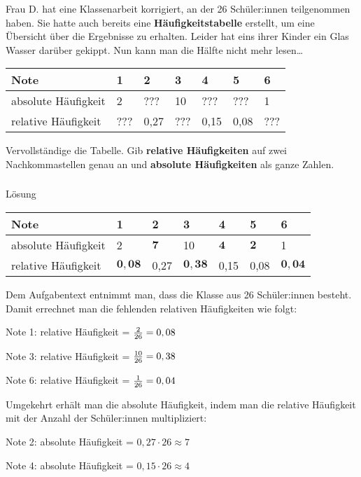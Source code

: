 \documentclass[
  ngerman,
]{book}
\begin{document}
Frau D. hat eine Klassenarbeit korrigiert, an der 26 Schüler:innen teilgenommen haben. Sie hatte auch bereits eine \textbf{Häufigkeitstabelle} erstellt, um eine Übersicht über die Ergebnisse zu erhalten. Leider hat eins ihrer Kinder ein Glas Wasser darüber gekippt. Nun kann man die Hälfte nicht mehr lesen\ldots{}

\begin{longtable}[]{@{}lllllll@{}}
\toprule
Note & 1 & 2 & 3 & 4 & 5 & 6\tabularnewline
\midrule
\endhead
absolute Häufigkeit & 2 & ??? & 10 & ??? & ??? & 1\tabularnewline
relative Häufigkeit & ??? & 0,27 & ??? & 0,15 & 0,08 & ???\tabularnewline
\bottomrule
\end{longtable}

Vervollständige die Tabelle. Gib \textbf{relative Häufigkeiten} auf zwei Nachkommastellen genau an und \textbf{absolute Häufigkeiten} als ganze Zahlen.

\hypertarget{section-8}{%
\subsubsection*{}\label{section-8}}

Lösung

\begin{longtable}[]{@{}lllllll@{}}
\toprule
Note & 1 & 2 & 3 & 4 & 5 & 6\tabularnewline
\midrule
\endhead
absolute Häufigkeit & 2 & \(\mathbf{7}\) & 10 & \(\mathbf{4}\) & \(\mathbf{2}\) & 1\tabularnewline
relative Häufigkeit & \(\mathbf{0,08}\) & 0,27 & \(\mathbf{0,38}\) & 0,15 & 0,08 & \(\mathbf{0,04}\)\tabularnewline
\bottomrule
\end{longtable}

Dem Aufgabentext entnimmt man, dass die Klasse aus 26 Schüler:innen besteht. Damit errechnet man die fehlenden relativen Häufigkeiten wie folgt:

Note 1: relative Häufigkeit = \({2 \over 26} = 0,08\)

Note 3: relative Häufigkeit = \({10 \over 26} = 0,38\)

Note 6: relative Häufigkeit = \({1 \over 26} = 0,04\)

Umgekehrt erhält man die absolute Häufigkeit, indem man die relative Häufigkeit mit der Anzahl der Schüler:innen multipliziert:

Note 2: absolute Häufigkeit = \(0,27 \cdot 26 \approx 7\)

Note 4: absolute Häufigkeit = \(0,15 \cdot 26 \approx 4\)
\end{document}
